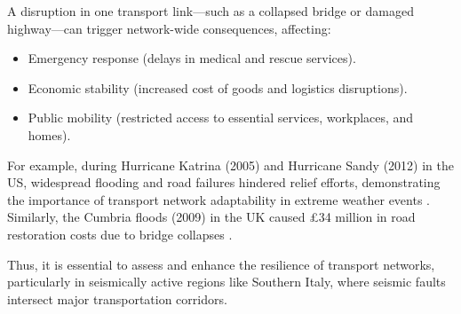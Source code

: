 A disruption in one transport link—such as a collapsed bridge or damaged highway—can trigger network-wide consequences, affecting:
\begin{itemize}
    \item Emergency response (delays in medical and rescue services).
    \item Economic stability (increased cost of goods and logistics disruptions).
    \item Public mobility (restricted access to essential services, workplaces, and homes).
\end{itemize}
For example, during Hurricane Katrina (2005) and Hurricane Sandy (2012) in the US, widespread flooding and road failures hindered relief efforts, demonstrating the importance of transport network adaptability in extreme weather events \cite{padgett2008}. Similarly, the Cumbria floods (2009) in the UK caused £34 million in road restoration costs due to bridge collapses \cite{cumbria2010}.

Thus, it is essential to assess and enhance the resilience of transport networks, particularly in seismically active regions like Southern Italy, where seismic faults intersect major transportation corridors.

